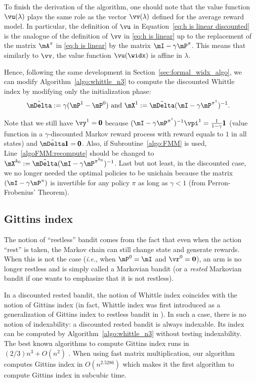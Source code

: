 To finish the derivation of the algorithm, one should note that the value function $\vu(\lambda)$ plays the same role as the vector $\vv(\lambda)$ defined for the average reward model.
In particular, the definition of $\vu$ in Equation~\eqref{eq:h is linear discounted} is the analogue of the definition of $\vv$ in \eqref{eq:h is linear} up to the replacement of the matrix $\mA^\pi$ in \eqref{eq:h is linear} by the matrix $\mI-\gamma \mP^\pi$.
This means that similarly to $\vv$, the value function $\vu(\widx)$ is affine in $\lambda$.

Hence, following the same development in Section~\ref{sec:formal_widx_algo}, we can modify Algorithm~\ref{algo:whittle_n3} to compute the discounted Whittle index by modifying only the initialization phase:
\begin{align*}
    \tilde{\mDelta}:=\gamma(\mP^1-\mP^0) \text{ and } \mX^1:=\tilde{\mDelta}(\mI-\gamma \mP^{\pi^1})^{-1}.
\end{align*}

Note that we still have $\vy^1=\pmb{0}$ because $(\mI-\gamma \mP^{\pi^1})^{-1}\vpi^1=\frac1{1-\gamma}\pmb{1}$ (value function in a $\gamma$-discounted Markov reward process with reward equals to $1$ in all states) and $\tilde{\mDelta}\pmb{1}=\pmb{0}$. Also, if Subroutine~\ref{algo:FMM} is used, Line~\ref{algoFMM:recompute} should be changed to $\mX^{k_0}:=\tilde{\mDelta}(\mI-\gamma \mP^{\pi^{k_0}})^{-1}$. Last but not least, in the discounted case, we no longer needed the optimal policies to be unichain because the matrix $(\mI-\gamma \mP^\pi)$ is invertible for any policy $\pi$ as long as $\gamma<1$ (from Perron-Frobenius' Theorem).

\subsection{Gittins index}

The notion of ``restless'' bandit comes from the fact that even when the action ``rest'' is taken, the Markov chain can still change state and generate rewards. When this is not the case (\emph{i.e.}, when $\mP^0=\mI$ and $\vr^0=\boldsymbol{0}$), an arm is no longer restless and is simply called a Markovian bandit (or a \emph{rested} Markovian bandit if one wants to emphasize that it is not restless).

In a discounted rested bandit, the notion of Whittle index coincides with the notion of Gittins index (in fact, Whittle index was first introduced as a generalization of Gittins index to restless bandit in \cite{whittle1988restless}). In such a case, there is no notion of indexability: a discounted rested bandit is always indexable. Its index can be computed by Algorithm~\ref{algo:whittle_n3} without testing indexability. The best known algorithms to compute Gittins index runs in $(2/3) n^3 +O(n^2)$ \cite{chakravorty2014multi}. When using fast matrix multiplication, our algorithm computes Gittins index in $O(n^{2.5286})$ which makes it the first algorithm to compute Gittins index in subcubic time.  

